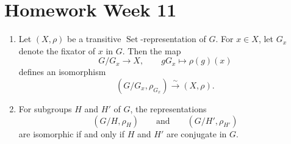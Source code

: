 \section{Homework Week 11}

\begin{exercise}
    \begin{enumerate}
        \item[(i)] Let \((X,\rho)\) be a transitive \(\operatorname{Set}\)-representation of \(G\).
        For \(x\in X\), let \(G_x\) denote the fixator of \(x\) in \(G\). Then the map
        \[
            G/G_x \longrightarrow X,
            \qquad
            gG_x \longmapsto \rho(g)(x)
        \]
        defines an isomorphism
        \[
            (G/G_x,\rho_{G_x}) \xrightarrow{\sim} (X,\rho).
        \]

        \item[(ii)] For subgroups \(H\) and \(H'\) of \(G\), the representations
        \[
            (G/H,\rho_H)
            \qquad\text{and}\qquad
            (G/H',\rho_{H'})
        \]
        are isomorphic if and only if \(H\) and \(H'\) are conjugate in \(G\).
    \end{enumerate}
\end{exercise}

